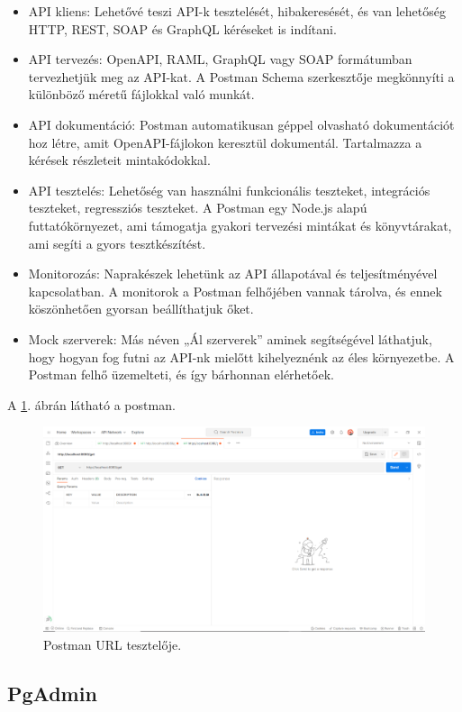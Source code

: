 \begin{itemize}
\item API kliens: Lehetővé teszi API-k tesztelését, hibakeresését, és van lehetőség HTTP, REST, SOAP és GraphQL kéréseket is indítani.
\item API tervezés: OpenAPI, RAML, GraphQL vagy SOAP formátumban tervezhetjük meg az API-kat. A Postman Schema szerkesztője megkönnyíti a különböző méretű fájlokkal való munkát.
\item API dokumentáció: Postman automatikusan géppel olvasható dokumentációt hoz létre, amit OpenAPI-fájlokon keresztül dokumentál. Tartalmazza a kérések részleteit mintakódokkal.
\item API tesztelés: Lehetőség van használni funkcionális teszteket, integrációs teszteket, regressziós teszteket. A Postman egy Node.js alapú futtatókörnyezet, ami támogatja gyakori tervezési mintákat és  könyvtárakat, ami segíti a gyors tesztkészítést.
\item Monitorozás: Naprakészek lehetünk az API állapotával és teljesítményével kapcsolatban. A monitorok a Postman felhőjében vannak tárolva, és ennek köszönhetően gyorsan beállíthatjuk őket.
\item Mock szerverek: Más néven „Ál szerverek” aminek segítségével láthatjuk, hogy hogyan fog futni az API-nk mielőtt kihelyeznénk az éles környezetbe. A Postman felhő üzemelteti, és így bárhonnan elérhetőek.
\end{itemize}

A \ref{fig:Postman}. ábrán látható a postman.

\begin{figure}[h]
\centering
\includegraphics[scale=0.8]{images/Postman.png}
\caption{Postman URL tesztelője.}
\label{fig:Postman}
\end{figure}
\newpage

\subsection{PgAdmin}

